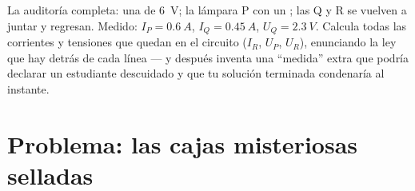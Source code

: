 \begin{exercise}[$\star\star\star$]\label{exo:g8:circuit-laws:12}
La auditoría completa: una  de \qty{6}{V}; la lámpara P
 con un ; las  Q y R se
vuelven a juntar y regresan. Medido: $I_P = \qty{0.6}{A}$, $I_Q =
\qty{0.45}{A}$, $U_Q = \qty{2.3}{V}$. Calcula todas las corrientes y
tensiones que quedan en el circuito ($I_R$, $U_P$, $U_R$),
enunciando la ley que hay detrás de cada línea --- y después inventa
una ``medida'' extra que podría declarar un estudiante descuidado y que
tu solución terminada condenaría al instante.
\end{exercise}

\section{Problema: las cajas misteriosas selladas}

